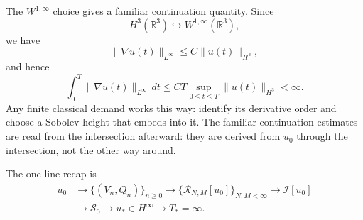 \documentclass[12pt]{article}
\newcommand{\R}{\mathbb R}
\newcommand{\I}{\mathcal I}
\begin{document}
The \(W^{1,\infty}\) choice gives a familiar continuation quantity. Since
\[
  H^3(\R^3)\hookrightarrow W^{1,\infty}(\R^3),
\]
we have
\[
  \|\nabla u(t)\|_{L^\infty}
  \leq
  C\|u(t)\|_{H^3},
\]
and hence
\[
  \int_0^T\|\nabla u(t)\|_{L^\infty}\,dt
  \leq
  CT
  \sup_{0\leq t\leq T}\|u(t)\|_{H^3}
  <\infty.
\]
Any finite classical demand works this way: identify its derivative order and
choose a Sobolev height that embeds into it. The familiar continuation estimates
are read from the intersection afterward: they are derived from \(u_0\) through
the intersection, not the other way around.

The one-line recap is
\[
\begin{aligned}
  u_0
  &\longrightarrow
  \{(V_n,Q_n)\}_{n\geq0}
  \longrightarrow
  \{\mathcal R_{N,M}[u_0]\}_{N,M<\infty}
  \longrightarrow
  \I[u_0]
  \\
  &\longrightarrow
  \mathscr S_0
  \longrightarrow
  u_*\in H^\infty
  \longrightarrow
  T_*=\infty.
\end{aligned}
\]
\end{document}
